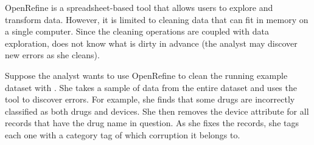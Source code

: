 \vspace{0.75em}

\begin{example}\label{detex2}
OpenRefine is a spreadsheet-based tool that allows users to explore and transform data.
However, it is limited to cleaning data that can fit in memory on a single computer.
Since the cleaning operations are coupled with data exploration, \sys does not know what is dirty in advance (the analyst may discover new errors as she cleans).

Suppose the analyst wants to use OpenRefine to clean the running example dataset with \sys.
She takes a sample of data from the entire dataset and uses the tool to discover errors.
For example, she finds that some drugs are incorrectly classified as both drugs and devices.
She then removes the device attribute for all records that have the drug name in question.
As she fixes the records, she tags each one with a category tag of which corruption it belongs to.
\end{example}





